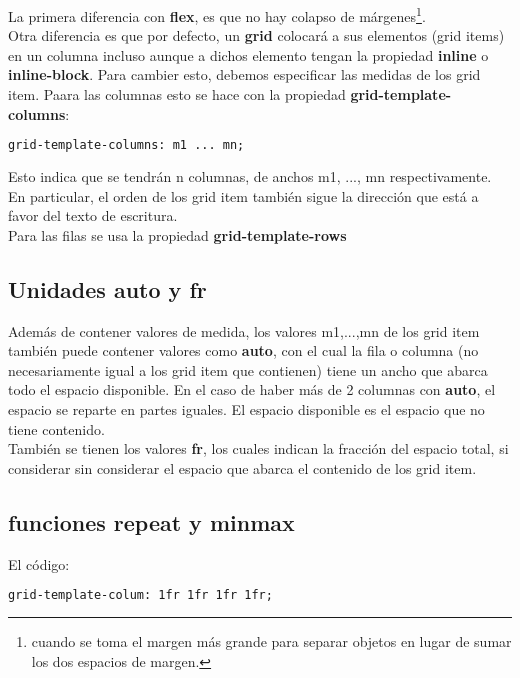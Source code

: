 \documentclass[10pt,oneside]{article}
\begin{document}
\begin{multicols}{2}
    La primera diferencia con \textbf{flex}, es que no hay colapso de márgenes\footnote{cuando se toma el margen más grande para separar objetos en lugar de sumar los dos espacios de margen.}. \\\newline
    Otra diferencia es que por defecto, un \textbf{grid} colocará a sus elementos (grid items) en un columna incluso aunque a dichos elemento tengan la propiedad \textbf{inline} o \textbf{inline-block}. Para cambier esto, debemos especificar las medidas de los  grid item. Paara las columnas esto se hace con la propiedad \textbf{grid-template-columns}:

    \begin{lstlisting}[language=HTML]
grid-template-columns: m1 ... mn;
    \end{lstlisting}

    Esto indica que se tendrán n columnas, de anchos m1, ..., mn respectivamente. En particular, el orden de los grid item también sigue la dirección que está a favor del texto de escritura. \\ \newline Para las filas se usa la propiedad \textbf{grid-template-rows}

\subsection{Unidades auto y fr}

    Además de contener valores de medida, los valores m1,...,mn de los grid item también puede contener valores como \textbf{auto}, con el cual la fila o columna (no necesariamente igual a los grid item 
 que contienen) tiene un ancho que abarca todo el espacio disponible. En el caso de haber más de 2 columnas con \textbf{auto}, el espacio se reparte en partes iguales. El espacio disponible es el espacio que no tiene contenido. \\ \newline También se tienen los valores \textbf{fr}, los cuales indican la fracción del espacio total, si considerar sin considerar el espacio que abarca el contenido de los grid item. 
 
 \subsection{funciones repeat y minmax}

    El código:

    \begin{lstlisting}[language=HTML]
grid-template-colum: 1fr 1fr 1fr 1fr;
    \end{lstlisting}


\end{multicols}
\end{document}
